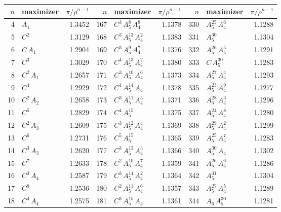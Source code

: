 \begin{longtable}{@{}rlr@{\quad}rlr@{\quad}rlr@{}}
\toprule
$n$ & maximizer & $\pi/\rho^{n-1}$ & $n$ & maximizer & $\pi/\rho^{n-1}$ & $n$ & maximizer & $\pi/\rho^{n-1}$\\
\midrule
\endhead
4 & $A_{1}$ & 1.3452 & 167 & $C^{3}$\,$A_{5}^{8}$\,$A_{4}^{8}$ & 1.1378 & 330 & $A_{5}^{25}$\,$A_{4}^{6}$ & 1.1288 \\
5 & $C^{2}$ & 1.3129 & 168 & $C^{3}$\,$A_{5}^{13}$\,$A_{4}^{2}$ & 1.1383 & 331 & $A_{5}^{30}$ & 1.1304 \\
6 & $C$\,$A_{1}$ & 1.2904 & 169 & $C^{3}$\,$A_{5}^{9}$\,$A_{4}^{7}$ & 1.1376 & 332 & $A_{5}^{26}$\,$A_{4}^{5}$ & 1.1291 \\
7 & $C^{3}$ & 1.3029 & 170 & $C^{4}$\,$A_{5}^{13}$\,$A_{4}^{2}$ & 1.1380 & 333 & $C$\,$A_{5}^{30}$ & 1.1283 \\
8 & $C^{2}$\,$A_{1}$ & 1.2657 & 171 & $C^{3}$\,$A_{5}^{10}$\,$A_{4}^{6}$ & 1.1373 & 334 & $A_{5}^{27}$\,$A_{4}^{4}$ & 1.1293 \\
9 & $C^{4}$ & 1.2929 & 172 & $C^{4}$\,$A_{5}^{14}$\,$A_{4}$ & 1.1378 & 335 & $A_{5}^{23}$\,$A_{4}^{9}$ & 1.1277 \\
10 & $C^{2}$\,$A_{2}$ & 1.2658 & 173 & $C^{3}$\,$A_{5}^{11}$\,$A_{4}^{5}$ & 1.1371 & 336 & $A_{5}^{28}$\,$A_{4}^{3}$ & 1.1296 \\
11 & $C^{5}$ & 1.2829 & 174 & $C^{4}$\,$A_{5}^{15}$ & 1.1375 & 337 & $A_{5}^{24}$\,$A_{4}^{8}$ & 1.1280 \\
12 & $C^{2}$\,$A_{3}$ & 1.2609 & 175 & $C^{3}$\,$A_{5}^{12}$\,$A_{4}^{4}$ & 1.1369 & 338 & $A_{5}^{29}$\,$A_{4}^{2}$ & 1.1299 \\
13 & $C^{6}$ & 1.2731 & 176 & $C^{5}$\,$A_{5}^{15}$ & 1.1365 & 339 & $A_{5}^{25}$\,$A_{4}^{7}$ & 1.1283 \\
14 & $C^{3}$\,$A_{3}$ & 1.2620 & 177 & $C^{3}$\,$A_{5}^{13}$\,$A_{4}^{3}$ & 1.1366 & 340 & $A_{5}^{30}$\,$A_{4}$ & 1.1302 \\
15 & $C^{7}$ & 1.2633 & 178 & $C^{2}$\,$A_{5}^{10}$\,$A_{4}^{7}$ & 1.1359 & 341 & $A_{5}^{26}$\,$A_{4}^{6}$ & 1.1286 \\
16 & $C^{3}$\,$A_{4}$ & 1.2587 & 179 & $C^{3}$\,$A_{5}^{14}$\,$A_{4}^{2}$ & 1.1364 & 342 & $A_{5}^{31}$ & 1.1304 \\
17 & $C^{8}$ & 1.2536 & 180 & $C^{2}$\,$A_{5}^{11}$\,$A_{4}^{6}$ & 1.1357 & 343 & $A_{5}^{27}$\,$A_{4}^{5}$ & 1.1289 \\
18 & $C^{4}$\,$A_{4}$ & 1.2575 & 181 & $C^{3}$\,$A_{5}^{15}$\,$A_{4}$ & 1.1361 & 344 & $A_{6}$\,$A_{5}^{30}$ & 1.1281 \\

\end{longtable}
